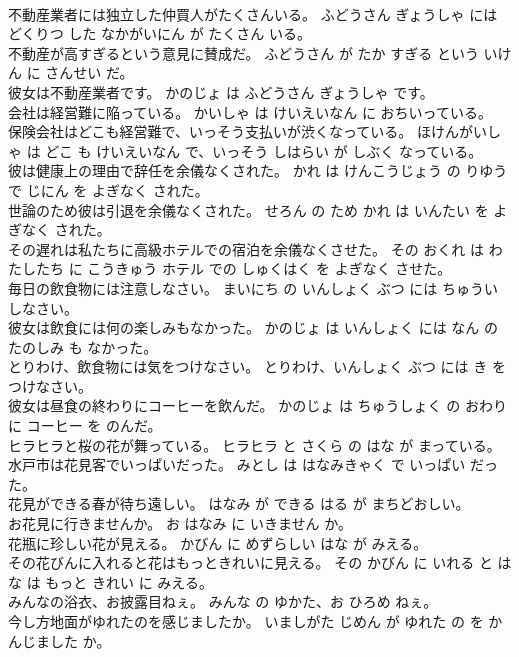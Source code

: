 \documentclass[8pt]{extreport}
\begin{document}
\begin{CJK}{UTF8}{min}
\\	不動産業者には独立した仲買人がたくさんいる。	ふどうさん ぎょうしゃ には どくりつ した なかがいにん が たくさん いる。	
\\	不動産が高すぎるという意見に賛成だ。	ふどうさん が たか すぎる という いけん に さんせい だ。	
\\	彼女は不動産業者です。	かのじょ は ふどうさん ぎょうしゃ です。	
\\	会社は経営難に陥っている。	かいしゃ は けいえいなん に おちいっている。	
\\	保険会社はどこも経営難で、いっそう支払いが渋くなっている。	ほけんがいしゃ は どこ も けいえいなん で、いっそう しはらい が しぶく なっている。	
\\	彼は健康上の理由で辞任を余儀なくされた。	かれ は けんこうじょう の りゆう で じにん を よぎなく された。	
\\	世論のため彼は引退を余儀なくされた。	せろん の ため かれ は いんたい を よぎなく された。	
\\	その遅れは私たちに高級ホテルでの宿泊を余儀なくさせた。	その おくれ は わたしたち に こうきゅう ホテル での しゅくはく を よぎなく させた。	
\\	毎日の飲食物には注意しなさい。	まいにち の いんしょく ぶつ には ちゅうい しなさい。	
\\	彼女は飲食には何の楽しみもなかった。	かのじょ は いんしょく には なん の たのしみ も なかった。	
\\	とりわけ、飲食物には気をつけなさい。	とりわけ、いんしょく ぶつ には き を つけなさい。	
\\	彼女は昼食の終わりにコーヒーを飲んだ。	かのじょ は ちゅうしょく の おわり に コーヒー を のんだ。	
\\	ヒラヒラと桜の花が舞っている。	ヒラヒラ と さくら の はな が まっている。	
\\	水戸市は花見客でいっぱいだった。	みとし は はなみきゃく で いっぱい だった。	
\\	花見ができる春が待ち遠しい。	はなみ が できる はる が まちどおしい。	
\\	お花見に行きませんか。	お はなみ に いきません か。	
\\	花瓶に珍しい花が見える。	かびん に めずらしい はな が みえる。	
\\	その花びんに入れると花はもっときれいに見える。	その かびん に いれる と はな は もっと きれい に みえる。	
\\	みんなの浴衣、お披露目ねぇ。	みんな の ゆかた、お ひろめ ねぇ。	
\\	今し方地面がゆれたのを感じましたか。	いましがた じめん が ゆれた の を かんじました か。	

\end{CJK}
\end{document}
